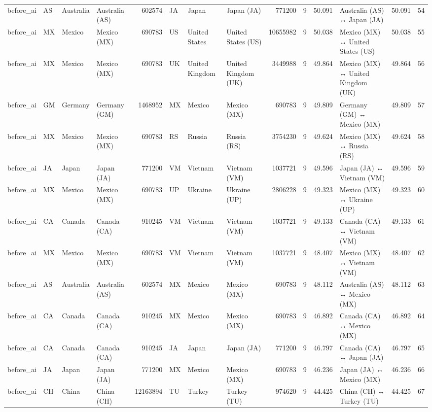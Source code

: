\begin{tabular}{llllrlllrrrlrr}
before\_ai & AS & Australia & Australia (AS) & 602574 & JA & Japan & Japan (JA) & 771200 & 9 & 50.091 & Australia (AS) ↔ Japan (JA) & 50.091 & 54 \\
before\_ai & MX & Mexico & Mexico (MX) & 690783 & US & United States & United States (US) & 10655982 & 9 & 50.038 & Mexico (MX) ↔ United States (US) & 50.038 & 55 \\
before\_ai & MX & Mexico & Mexico (MX) & 690783 & UK & United Kingdom & United Kingdom (UK) & 3449988 & 9 & 49.864 & Mexico (MX) ↔ United Kingdom (UK) & 49.864 & 56 \\
before\_ai & GM & Germany & Germany (GM) & 1468952 & MX & Mexico & Mexico (MX) & 690783 & 9 & 49.809 & Germany (GM) ↔ Mexico (MX) & 49.809 & 57 \\
before\_ai & MX & Mexico & Mexico (MX) & 690783 & RS & Russia & Russia (RS) & 3754230 & 9 & 49.624 & Mexico (MX) ↔ Russia (RS) & 49.624 & 58 \\
before\_ai & JA & Japan & Japan (JA) & 771200 & VM & Vietnam & Vietnam (VM) & 1037721 & 9 & 49.596 & Japan (JA) ↔ Vietnam (VM) & 49.596 & 59 \\
before\_ai & MX & Mexico & Mexico (MX) & 690783 & UP & Ukraine & Ukraine (UP) & 2806228 & 9 & 49.323 & Mexico (MX) ↔ Ukraine (UP) & 49.323 & 60 \\
before\_ai & CA & Canada & Canada (CA) & 910245 & VM & Vietnam & Vietnam (VM) & 1037721 & 9 & 49.133 & Canada (CA) ↔ Vietnam (VM) & 49.133 & 61 \\
before\_ai & MX & Mexico & Mexico (MX) & 690783 & VM & Vietnam & Vietnam (VM) & 1037721 & 9 & 48.407 & Mexico (MX) ↔ Vietnam (VM) & 48.407 & 62 \\
before\_ai & AS & Australia & Australia (AS) & 602574 & MX & Mexico & Mexico (MX) & 690783 & 9 & 48.112 & Australia (AS) ↔ Mexico (MX) & 48.112 & 63 \\
before\_ai & CA & Canada & Canada (CA) & 910245 & MX & Mexico & Mexico (MX) & 690783 & 9 & 46.892 & Canada (CA) ↔ Mexico (MX) & 46.892 & 64 \\
before\_ai & CA & Canada & Canada (CA) & 910245 & JA & Japan & Japan (JA) & 771200 & 9 & 46.797 & Canada (CA) ↔ Japan (JA) & 46.797 & 65 \\
before\_ai & JA & Japan & Japan (JA) & 771200 & MX & Mexico & Mexico (MX) & 690783 & 9 & 46.236 & Japan (JA) ↔ Mexico (MX) & 46.236 & 66 \\
before\_ai & CH & China & China (CH) & 12163894 & TU & Turkey & Turkey (TU) & 974620 & 9 & 44.425 & China (CH) ↔ Turkey (TU) & 44.425 & 67 \\

\end{tabular}
